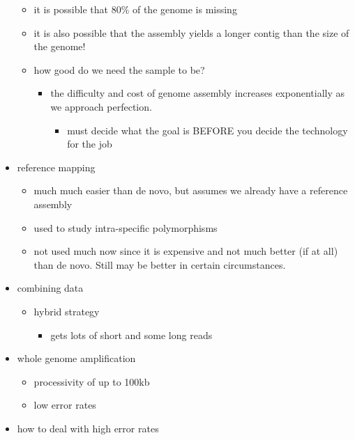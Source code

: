 \documentclass{article}
\begin{document}
\begin{itemize}
\begin{itemize}
\begin{itemize}
            \end{itemize}
            \item it is possible that 80\% of the genome is missing
            \item it is also possible that the assembly yields a longer contig than the size of the genome!
            \item how good do we need the sample to be?
            \begin{itemize}
                \item the difficulty and cost of genome assembly increases exponentially as we approach perfection.
                \begin{itemize}
                    \item must decide what the goal is BEFORE you decide the technology for the job
                \end{itemize}
            \end{itemize}
        \end{itemize}
        \item reference mapping
        \begin{itemize}
            \item much much easier than de novo, but assumes we already have a reference assembly
            \item used to study intra-specific polymorphisms
            \item not used much now since it is expensive and not much better (if at all) than de novo.  Still may be better in certain circumstances. 
        \end{itemize}
        \item combining data
        \begin{itemize}
            \item hybrid strategy
            \begin{itemize}
                \item gets lots of short and some long reads
            \end{itemize}
        \end{itemize}
        \item whole genome amplification
        \begin{itemize}
            \item processivity of up to 100kb
            \item low error rates
        \end{itemize}
        \item how to deal with high error rates

\end{itemize}
\end{document}
